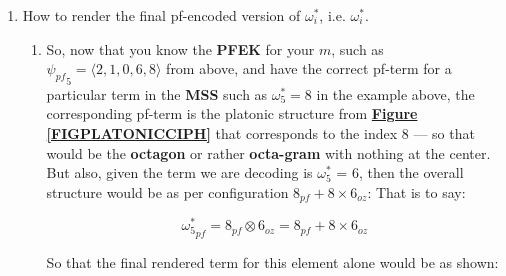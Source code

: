 \documentclass[a4paper, 18pt]{book} %
\begin{document}
\begin{appendices}
\begin{enumerate}
{\begin{enumerate}
\[
\begin{tikzpicture}[baseline=(current bounding box.center)]
  \matrix (A) [matrix of math nodes, left delimiter={[}, right delimiter={]}, row sep=1em, column sep=2em] {
    0 & 2 & 1 & 3 & 6 \\
  };

  \matrix (B) [matrix of math nodes, left delimiter={[}, right delimiter={]}, row sep=1em, column sep=2em, below=3em of A] {
    2 & 1 & 0 & 6 & 8\\
  };

  \foreach \i in {1,2,3,4,5}
    \draw[->] (A-1-\i) -- (B-1-\i);
\end{tikzpicture}
\]

And so, for the last term in that \textbf{MSS}, $\boxed{\omega_5^*} = 8$

\end{enumerate}
}

\item{How to render the final pf-encoded version of $\omega_i^*$, i.e. $\boxed{\omega_i^*}$.
\begin{enumerate}
\item So, now that you know the \textbf{PFEK} for your $m$, such as $\boxed{\psi_{pf}}_5 = \langle 2, 1, 0, 6, 8 \rangle $ from above, and have the correct pf-term for a particular term in the \textbf{MSS} such as $\boxed{\omega_5^*} = 8$ in the example above, the corresponding pf-term is the platonic structure from \textbf{\hyperref[FIGPLATONICCIPH]{Figure \ref{FIGPLATONICCIPH}}} that corresponds to the index $8$ --- so that would be the \textbf{octagon} or rather \textbf{octa-gram} with nothing at the center. But also, given the term we are decoding is $\omega_5^*$ = 6, then the overall structure would be as per configuration \textbf{$8_{pf} + 8 \times 6_{oz}$}: That is to say:

\begin{equation}
\boxed{\omega_5^*}_{pf} = 8_{pf} \otimes 6_{oz} = 8_{pf} + 8 \times 6_{oz}
\end{equation}

So that the final rendered term for this element alone would be as shown:



\end{enumerate}}
\end{enumerate}
\end{appendices}
\end{document}
